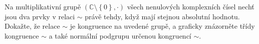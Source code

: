 \subsubsection{}
Na multiplikativní grupě $(\mathbb{C} \setminus \left \{ 0 \right \} ,\cdot )$
všech nenulových komplexních čísel nechť jsou dva prvky v relaci $\sim$ právě
tehdy, když mají stejnou absolutní hodnotu. Dokažte, že relace $\sim$ je
kongruence na uvedené grupě, a graficky znázorněte třídy kongruence $\sim$ a
také normální podgrupu určenou kongruencí $\sim$.
